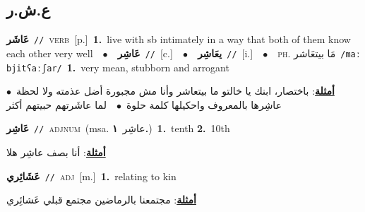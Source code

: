\documentclass[10pt,a4paper,twoside]{article} %
\begin{document}
\begin{multicols}{2}
\vspace{-3mm}
\subsection*{\color{blue}\foreignlanguage{arabic}{ع.ش.ر}\color{blue}{}} 

{\setlength\topsep{0pt}\textbf{\foreignlanguage{arabic}{عَاشَر}}\ {\color{gray}\texttt{//}\color{black}}\ \textsc{verb}\ [p.]\ \textbf{1.}~live with sb intimately in a way that both of them know each other very well\ \ $\bullet$\ \ \setlength\topsep{0pt}\textbf{\foreignlanguage{arabic}{عَاشِر}}\ {\color{gray}\texttt{//}\color{black}}\ [c.]\ \ $\bullet$\ \ \setlength\topsep{0pt}\textbf{\foreignlanguage{arabic}{يعَاشِر}}\ {\color{gray}\texttt{//}\color{black}}\ [i.]\ \ $\bullet$\ \ \textsc{ph.} \color{gray} \foreignlanguage{arabic}{مَا بيتعَاشر}\color{black}\ {\color{gray}\texttt{/{\sffamily maː bjitʕaːʃar}/}\color{black}}\ \textbf{1.}~very mean, stubborn and arrogant\  \begin{flushright}\color{gray}\foreignlanguage{arabic}{\textbf{\underline{\foreignlanguage{arabic}{أمثلة}}}: باختصار، ابنك يا خالتو ما بيتعاشر وأنا مش مجبورة أضل عذمته ولا لحظة\ $\bullet$\ \  عاشِرها بالمعروف واحكيلها كلمة حلوة\ $\bullet$\ \  لما عاشَرتهم حبيتهم أكثر}\end{flushright}\color{black}} \vspace{2mm}

{\setlength\topsep{0pt}\textbf{\foreignlanguage{arabic}{عَاشِر}}\ {\color{gray}\texttt{//}\color{black}}\ \textsc{adj\textunderscore num}\ \color{gray}(msa. \foreignlanguage{arabic}{عاشِر}~\foreignlanguage{arabic}{\textbf{١.}})\color{black}\ \textbf{1.}~tenth  \textbf{2.}~10th\  \begin{flushright}\color{gray}\foreignlanguage{arabic}{\textbf{\underline{\foreignlanguage{arabic}{أمثلة}}}: أنا بصف عاشِر هلا}\end{flushright}\color{black}} \vspace{2mm}

{\setlength\topsep{0pt}\textbf{\foreignlanguage{arabic}{عَشَائِري}}\ {\color{gray}\texttt{//}\color{black}}\ \textsc{adj}\ [m.]\ \textbf{1.}~relating to kin\  \begin{flushright}\color{gray}\foreignlanguage{arabic}{\textbf{\underline{\foreignlanguage{arabic}{أمثلة}}}: مجتمعنا بالرماضين مجتمع قبلي عَشائِري}\end{flushright}\color{black}} \vspace{2mm}


\end{multicols}
\end{document}
